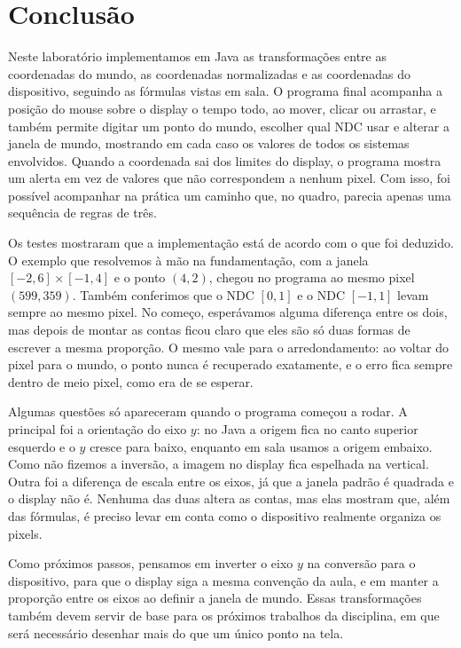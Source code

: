 \section{Conclusão}

Neste laboratório implementamos em Java as transformações entre as coordenadas do mundo, as coordenadas normalizadas e as coordenadas do dispositivo, seguindo as fórmulas vistas em sala. O programa final acompanha a posição do mouse sobre o display o tempo todo, ao mover, clicar ou arrastar, e também permite digitar um ponto do mundo, escolher qual NDC usar e alterar a janela de mundo, mostrando em cada caso os valores de todos os sistemas envolvidos. Quando a coordenada sai dos limites do display, o programa mostra um alerta em vez de valores que não correspondem a nenhum pixel. Com isso, foi possível acompanhar na prática um caminho que, no quadro, parecia apenas uma sequência de regras de três.

Os testes mostraram que a implementação está de acordo com o que foi deduzido. O exemplo que resolvemos à mão na fundamentação, com a janela $[-2, 6] \times [-1, 4]$ e o ponto $(4, 2)$, chegou no programa ao mesmo pixel $(599, 359)$. Também conferimos que o NDC $[0,1]$ e o NDC $[-1,1]$ levam sempre ao mesmo pixel. No começo, esperávamos alguma diferença entre os dois, mas depois de montar as contas ficou claro que eles são só duas formas de escrever a mesma proporção. O mesmo vale para o arredondamento: ao voltar do pixel para o mundo, o ponto nunca é recuperado exatamente, e o erro fica sempre dentro de meio pixel, como era de se esperar.

Algumas questões só apareceram quando o programa começou a rodar. A principal foi a orientação do eixo $y$: no Java a origem fica no canto superior esquerdo e o $y$ cresce para baixo, enquanto em sala usamos a origem embaixo. Como não fizemos a inversão, a imagem no display fica espelhada na vertical. Outra foi a diferença de escala entre os eixos, já que a janela padrão é quadrada e o display não é. Nenhuma das duas altera as contas, mas elas mostram que, além das fórmulas, é preciso levar em conta como o dispositivo realmente organiza os pixels.

Como próximos passos, pensamos em inverter o eixo $y$ na conversão para o dispositivo, para que o display siga a mesma convenção da aula, e em manter a proporção entre os eixos ao definir a janela de mundo. Essas transformações também devem servir de base para os próximos trabalhos da disciplina, em que será necessário desenhar mais do que um único ponto na tela.
